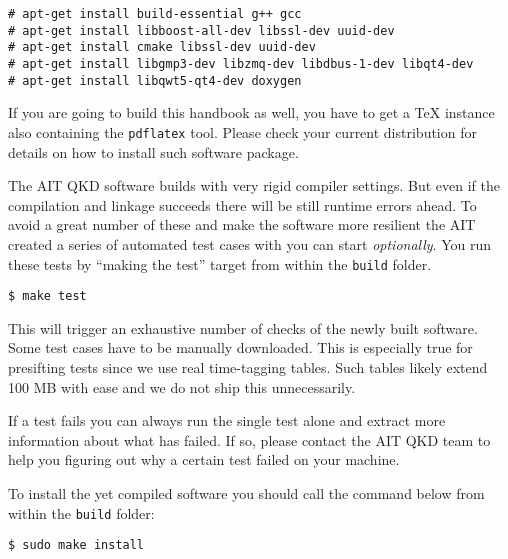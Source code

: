 \begin{minipage}{0.9\textwidth}
\bigskip
\begin{verbatim}
# apt-get install build-essential g++ gcc 
# apt-get install libboost-all-dev libssl-dev uuid-dev 
# apt-get install cmake libssl-dev uuid-dev  
# apt-get install libgmp3-dev libzmq-dev libdbus-1-dev libqt4-dev 
# apt-get install libqwt5-qt4-dev doxygen 
\end{verbatim}
\medskip
\end{minipage}

If you are going to build this handbook as well, you have to get a \TeX{} instance also containing the \texttt{pdflatex} tool. Please check your current distribution for details on how to install such software package.

\medskip

The AIT QKD software builds with very rigid compiler settings. But even if the compilation and linkage succeeds there will be still runtime errors ahead. To avoid a great number of these and make the software more resilient the AIT created a series of automated test cases with you can start \textit{optionally}. You run these tests by ``making the test'' target from within the \texttt{build} folder.

\begin{minipage}{0.9\textwidth}
\bigskip
\begin{verbatim}
$ make test
\end{verbatim}
\medskip
\end{minipage}

This will trigger an exhaustive number of checks of the newly built software. Some test cases have to be manually downloaded. This is especially true for presifting tests since we use real time-tagging tables. Such tables likely extend 100 MB with ease and we do not ship this unnecessarily.

\medskip

If a test fails you can always run the single test alone and extract more information about what has failed. If so, please contact the AIT QKD team to help you figuring out why a certain test failed on your machine.

\medskip

To install the yet compiled software you should call the command below from within the \texttt{build} folder:

\begin{minipage}{0.9\textwidth}
\bigskip
\begin{verbatim}
$ sudo make install
\end{verbatim}
\medskip
\end{minipage}


